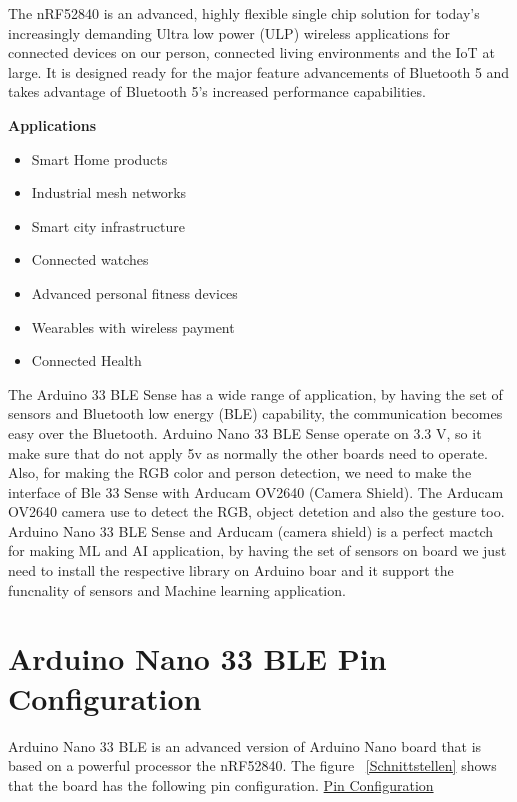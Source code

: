 The nRF52840 is an advanced, highly flexible single chip solution for today’s increasingly demanding Ultra low power (ULP) wireless applications for connected devices on our person, connected living environments and the IoT at large. It is designed ready for the major feature
advancements of Bluetooth 5 and takes advantage of Bluetooth 5’s increased performance capabilities. \cite{Arduino:2021b}

\textbf{Applications}

\begin{itemize}
  \item Smart Home products
  \item Industrial mesh networks
  \item Smart city infrastructure
  \item Connected watches
  \item Advanced personal fitness devices
  \item Wearables with wireless payment
  \item Connected Health
\end{itemize}

The Arduino 33 BLE Sense has a wide range of application, by having the set of sensors and Bluetooth low energy (BLE) capability, the communication becomes easy over the Bluetooth. Arduino Nano 33 BLE Sense operate on 3.3 V, so it make sure that do not apply 5v as normally the other boards need to operate. Also, for making the RGB color and person detection, we need to make the interface of Ble 33 Sense with Arducam OV2640 (Camera Shield). The Arducam OV2640 camera use  to detect the RGB, object detetion and also the gesture too. Arduino Nano 33 BLE Sense and Arducam (camera shield) is a perfect mactch for making ML and AI application, by having the set of sensors on board we just need to install the respective library on Arduino boar and it support the funcnality of sensors and Machine learning application.

\section{Arduino Nano 33 BLE Pin Configuration}

Arduino Nano 33 BLE is an advanced version of Arduino Nano board that is based on a powerful processor the nRF52840. The figure ~\ref{Schnittstellen} shows that the board has the following pin configuration. \href{https://www.etechnophiles.com/arduino-nano-33-ble-sense-pinout-introduction-specifications/}{Pin Configuration}

